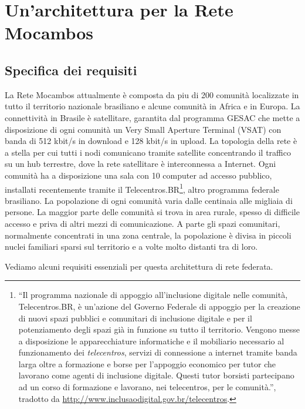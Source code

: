
\chapter{Un'architettura per la Rete Mocambos}
\label{Capitolo3}

\section{Specifica dei requisiti}
La Rete Mocambos attualmente è composta da piu di 200 comunità
localizzate in tutto il territorio nazionale brasiliano e alcune
comunità in Africa e in Europa. La connettività in Brasile è
satellitare, garantita dal programma GESAC che mette a disposizione di
ogni comunità un Very Small Aperture Terminal (VSAT) con banda di 512
kbit/s in download e 128 kbit/s in upload. La topologia della rete è a
stella per cui tutti i nodi comunicano tramite satellite concentrando
il traffico su un hub terrestre, dove la rete satellitare è
interconnessa a Internet. Ogni comunità ha a disposizione una sala con
10 computer ad accesso pubblico, installati recentemente tramite il
Telecentros.BR\footnote{``Il programma nazionale di appoggio
  all'inclusione digitale nelle comunità, Telecentros.BR, è un'azione
  del Governo Federale di appoggio per la creazione di nuovi spazi
  pubblici e comunitari di inclusione digitale e per il potenziamento
  degli spazi già in funzione su tutto il territorio. Vengono messe a
  disposizione le apparecchiature informatiche e il mobiliario
  necessario al funzionamento dei \textit{telecentros}, servizi di
  connessione a internet tramite banda larga oltre a formazione e
  borse per l'appoggio economico per tutor che lavorano come agenti di
  inclusione digitale. Questi tutor borsisti partecipano ad un corso
  di formazione e lavorano, nei telecentros, per le comunità.'',
  tradotto da \url{http://www.inclusaodigital.gov.br/telecentros}.},
altro programma federale brasiliano. La popolazione di ogni comunità
varia dalle centinaia alle migliaia di persone. La maggior parte delle
comunità si trova in area rurale, spesso di difficile accesso e priva
di altri mezzi di comunicazione. A parte gli spazi comunitari,
normalmente concentrati in una zona centrale, la popolazione è divisa
in piccoli nuclei familiari sparsi sul territorio e a volte molto
distanti tra di loro.

Vediamo alcuni requisiti essenziali per questa architettura di rete
federata.

